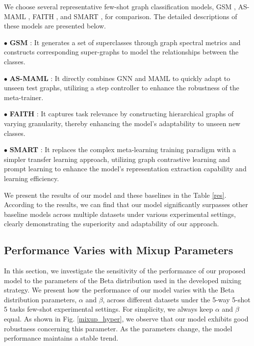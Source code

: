 We choose several representative few-shot graph classification models, GSM \cite{chauhan2020few}, AS-MAML \cite{ma2020adaptive}, FAITH \cite{wang2022faith}, and SMART \cite{liu2024simple}, for comparison. The detailed descriptions of these models are presented below. 

\noindent $\bullet$ \textbf{GSM} \cite{chauhan2020few}: It generates a set of superclasses through graph spectral metrics and constructs corresponding super-graphs to model the relationships between the classes.

\noindent $\bullet$ \textbf{AS-MAML} \cite{ma2020adaptive}: It directly combines GNN and MAML to quickly adapt to unseen test graphs, utilizing a step controller to enhance the robustness of the meta-trainer.

\noindent $\bullet$ \textbf{FAITH} \cite{wang2022faith}: It captures task relevance by constructing hierarchical graphs of varying granularity, thereby enhancing the model's adaptability to unseen new classes.

\noindent $\bullet$ \textbf{SMART} \cite{liu2024simple}: It replaces the complex meta-learning training paradigm with a simpler transfer learning approach, utilizing graph contrastive learning and prompt learning to enhance the model's representation extraction capability and learning efficiency.

We present the results of our model and these baselines in the Table \ref{res}. According to the results, we can find that our model significantly surpasses other baseline models across multiple datasets under various experimental settings, clearly demonstrating the superiority and adaptability of our approach.

\subsection{Performance Varies with Mixup Parameters}
In this section, we investigate the sensitivity of the performance of our proposed model to the parameters of the Beta distribution used in the developed mixing strategy. We present how the performance of our model varies with the Beta distribution parameters, $\alpha$ and $\beta$, across different datasets under the 5-way 5-shot 5 tasks few-shot experimental settings. For simplicity, we always keep $\alpha$ and $\beta$ equal. As shown in Fig. \ref{mixup_hyper}, we observe that our model exhibits good robustness concerning this parameter. As the parameters change, the model performance maintains a stable trend.


